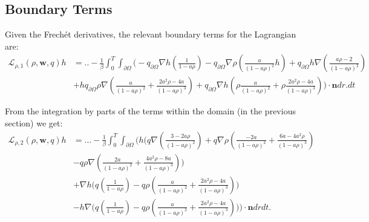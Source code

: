 \documentclass[11pt, a4paper]{article}
\theoremstyle{definition}
\newcommand{\w}{\mathbf{w}}
\newcommand{\n}{\mathbf{n}}
\begin{document}
\subsection{Boundary Terms}
Given the Frech\'et derivatives, the relevant boundary terms for the Lagrangian are:
\begin{align*}
	\mathcal{L}_{\rho,1}(\rho,\w, q) h &=.. - \frac{1}{\beta}\int_0^T \int_{\partial \Omega} \bigg(- q_{\partial \Omega}\nabla h \left(\frac{1}{1 - a\rho}\right) - q_{\partial \Omega}\nabla \rho \left( \frac{a}{(1 -a \rho)^2}h \right)+ q_{\partial \Omega}h \nabla \left(\frac{a \rho  - 2}{(1- a \rho)^2}\right) \\
	&+ h q_{\partial \Omega}\rho \nabla \left( \frac{a}{(1- a \rho)^2} + \frac{2a^2\rho - 4a}{(1- a \rho)^3} \right) + q_{\partial \Omega}\nabla h \left( \rho \frac{a}{(1- a \rho)^2} + \rho\frac{2a^2\rho - 4a}{(1- a \rho)^3} \right) \bigg) \cdot \n dr. dt
\end{align*}

From the integration by parts of the terms within the domain (in the previous section) we get:
\begin{align*}
	\mathcal{L}_{\rho,2}(\rho, \w,q)h &=... - \frac{1}{\beta}\int_0^T \int_{\partial \Omega} \bigg(h \bigg( q  \nabla \left( \frac{3-2a\rho}{(1-a\rho)^2} \right) + q \nabla \rho  \left( \frac{-2a }{(1-a\rho)^2} + \frac{6a-4a^2  \rho}{(1-a\rho)^3}  \right)\\
	&- q\rho \nabla \left(\frac{2a }{(1-a\rho)^2} + \frac{4a^2\rho -8a}{(1-a\rho)^3} \right) \bigg)\\
	& + \nabla h \bigg(q \left(\frac{1}{1- a\rho} \right)  - q\rho  \left(\frac{a }{(1-a\rho)^2} + \frac{2a^2\rho -4a}{(1-a\rho)^3} \right)  \bigg) \\
	&- h \nabla \bigg(q \left(\frac{1}{1- a\rho} \right)  - q\rho  \left(\frac{a }{(1-a\rho)^2} + \frac{2a^2\rho -4a}{(1-a\rho)^3} \right)  \bigg) \bigg)\cdot \n dr dt.
\end{align*}
\end{document}
